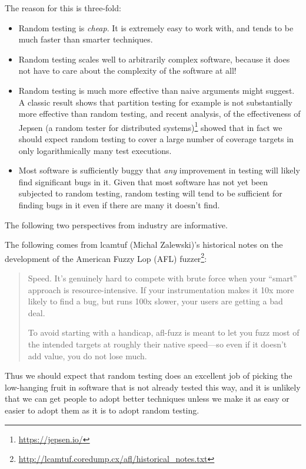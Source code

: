 The reason for this is three-fold:

\begin{itemize}
\item Random testing is \emph{cheap}.
It is extremely easy to work with, and tends to be much faster than smarter techniques.
\item Random testing scales well to arbitrarily complex software,
because it does not have to care about the complexity of the software at all!
\item Random testing is much more effective than naive arguments might suggest. A classic result\cite{DBLP:journals/tse/HamletT90} shows that partition testing for example is not substantially more effective than random testing,
and recent analysis\cite{DBLP:journals/pacmpl/MajumdarN18}, of the effectiveness of Jepsen (a random tester for distributed systems)\footnote{\url{https://jepsen.io/}} showed that in fact we should expect random testing to cover a large number of coverage targets in only logarithmically many test executions.
\item Most software is sufficiently buggy that \emph{any} improvement in testing will likely find significant bugs in it.
Given that most software has not yet been subjected to random testing,
random testing will tend to be sufficient for finding bugs in it even if there are many it doesn't find.
\end{itemize}

The following two perspectives from industry are informative.

The following comes from lcamtuf (Michal Zalewski)'s historical notes on the development of the American Fuzzy Lop (AFL) fuzzer\footnote{\url{http://lcamtuf.coredump.cx/afl/historical_notes.txt}}:

\begin{quote}
Speed.
It's genuinely hard to compete with brute force when your ``smart''
approach is resource-intensive. If your instrumentation makes it 10x more
likely to find a bug, but runs 100x slower, your users are getting a bad
deal.

To avoid starting with a handicap, afl-fuzz is meant to let you fuzz most of
the intended targets at roughly their native speed---so even if it doesn't
add value, you do not lose much.
\end{quote}

Thus we should expect that random testing does an excellent job of picking the low-hanging fruit in software that is not already tested this way,
and it is unlikely that we can get people to adopt better techniques unless we make it as easy or easier to adopt them as it is to adopt random testing.

